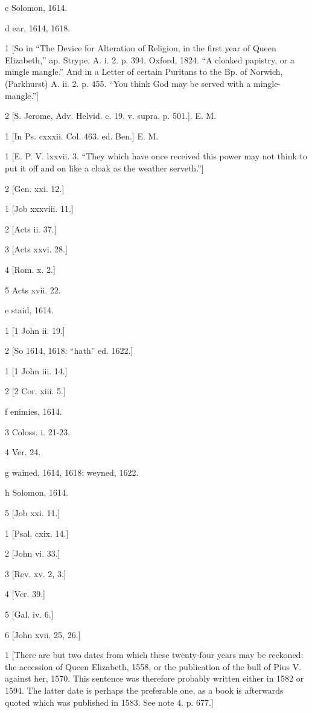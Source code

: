 c
Solomon, 1614.

d
ear, 1614, 1618.

1
[So in “The Device for Alteration of Religion, in the first year of Queen Elizabeth,” ap. Strype, A. i. 2. p. 394. Oxford, 1824. “A cloaked papistry, or a mingle mangle.” And in a Letter of certain Puritans to the Bp. of Norwich, (Parkhurst) A. ii. 2. p. 455. “You think God may be served with a mingle-mangle.”]

2
[S. Jerome, Adv. Helvid. c. 19. v. supra, p. 501.]. E. M.

1
[In Ps. cxxxii. Col. 463. ed. Ben.] E. M.

1
[E. P. V. lxxvii. 3. “They which have once received this power may not think to put it off and on like a cloak as the weather serveth.”]

2
[Gen. xxi. 12.]

1
[Job xxxviii. 11.]

2
[Acts ii. 37.]

3
[Acts xxvi. 28.]

4
[Rom. x. 2.]

5
Acts xvii. 22.

e
staid, 1614.

1
[1 John ii. 19.]

2
[So 1614, 1618: “hath” ed. 1622.]

1
[1 John iii. 14.]

2
[2 Cor. xiii. 5.]

f
enimies, 1614.

3
Coloss. i. 21-23.

4
Ver. 24.

g
wained, 1614, 1618: weyned, 1622.

h
Solomon, 1614.

5
[Job xxi. 11.]

1
[Psal. cxix. 14.]

2
[John vi. 33.]

3
[Rev. xv. 2, 3.]

4
[Ver. 39.]

5
[Gal. iv. 6.]

6
[John xvii. 25, 26.]

1
[There are but two dates from which these twenty-four years may be reckoned: the accession of Queen Elizabeth, 1558, or the publication of the bull of Pius V. against her, 1570. This sentence was therefore probably written either in 1582 or 1594. The latter date is perhaps the preferable one, as a book is afterwards quoted which was published in 1583. See note 4. p. 677.]

